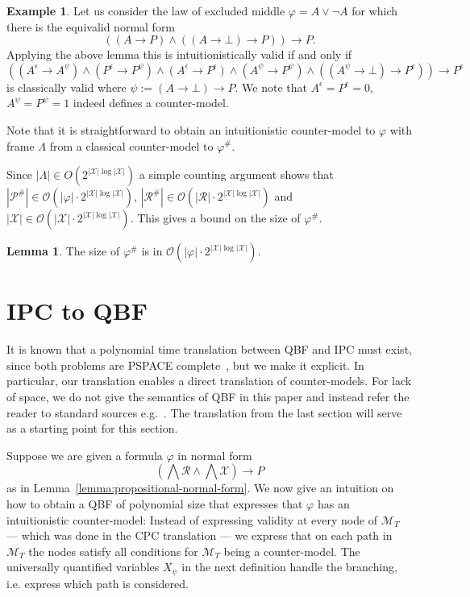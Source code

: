 \documentclass{easychair}
\theoremstyle{definition}
\theoremstyle{definition}
\theoremstyle{definition}
\newtheorem{lemma}[theorem]{Lemma}
\theoremstyle{definition}
\theoremstyle{definition}
\theoremstyle{definition}
\newtheorem{example}[theorem]{Example}
\theoremstyle{definition}
\begin{document}
\begin{example}
	Let us consider the law of excluded middle $\varphi = A\vee\neg A$ for which there is the equivalid normal form
	$$((A\to P)\wedge ((A\to \bot)\to P))\to P.$$
	Applying the above lemma this is intuitionistically valid if and only if $$((A^\epsilon\to A^\psi)\wedge(P^\epsilon\to P^\psi)\wedge(A^\epsilon\to P^\epsilon)\wedge(A^\psi\to P^\psi)\wedge ((A^\psi\to \bot)\to P^\epsilon))\to P^\epsilon$$ is classically valid where $\psi := (A\to \bot)\to P$.
	We note that $A^\epsilon  = P^\epsilon = 0$, $A^\psi = P^{\psi}  = 1$ indeed defines a counter-model.
\end{example}

Note that it is straightforward to obtain an intuitionistic counter-model to $\varphi$ with frame $\Lambda$ from a classical counter-model to $\varphi^\#$.

Since $|\Lambda|\in O(2^{|\mathcal X|\log |\mathcal X|})$ a simple counting argument shows that $|\mathcal P^\#|\in\mathcal O(|\varphi|\cdot 2^{|\mathcal X|\log |\mathcal X|})$, $|\mathcal R^\#|\in\mathcal O(|\mathcal R|\cdot2^{|\mathcal X|\log |\mathcal X|})$ and $|\mathcal X|\in \mathcal O(|\mathcal X|\cdot 2^{|\mathcal X|\log|\mathcal X|})$. This gives a bound on the size of $\varphi^\#$.

\begin{lemma}
	The size of $\varphi^\#$ is in $\mathcal O(|\varphi|\cdot 2^{|\mathcal X|\log|\mathcal X|})$.
\end{lemma}

\section{IPC to QBF}\label{sec:qbf}

It is known that a polynomial time translation between QBF and IPC must exist, since both problems are PSPACE complete~\cite{garey1979computers,statman1979intuitionistic}, but we make it explicit. In particular, our translation enables a direct translation of counter-models. For lack of space, we do not give the semantics of QBF in this paper and instead refer the reader to standard sources e.g.~\cite{series/faia/2009-185}.
The translation from the last section will serve as a starting point for this section.

Suppose we are given a formula $\varphi$ in normal form $$\left(\bigwedge\mathcal R\wedge\bigwedge\mathcal X\right)\to P$$ as in Lemma~\ref{lemma:propositional-normal-form}. We now give an intuition on how to obtain a QBF of polynomial size that expresses that $\varphi$ has an intuitionistic counter-model:
Instead of expressing validity at every node of $\mathcal M_T$ --- which was done in the CPC translation --- we express that on each path in $\mathcal M_T$ the nodes satisfy all conditions for $\mathcal M_T$ being a counter-model.
The universally quantified variables $X_\psi$ in the next definition handle the branching, i.e. express which path is considered.
\end{document}
